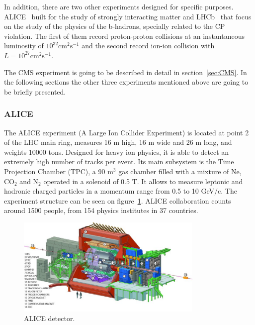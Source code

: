 In addition, there are two other experiments designed for specific purposes. ALICE~\cite{Cortese:879894} built for the study of strongly interacting matter and LHCb~\cite{Alves:2008zz} that focus on the study of the physics of the b-hadrons, specially related to the CP violation. The first of them record proton-proton collisions at an instantaneous luminosity of $10^{32}\text{cm}^{2}\text{s}^{-1}$ and the second record ion-ion collision with $L = 10^{27}\text{cm}^{2}\text{s}^{-1}$.

The CMS experiment is going to be described in detail in section~\ref{sec:CMS}. In the following sections the other three experiments mentioned above are going to be briefly presented. 

\subsubsection{ALICE}
\label{sec:alice}

The ALICE experiment (A Large Ion Collider Experiment) is located at point 2 of the LHC main ring, measures 16 m high, 16 m wide and 26 m long, and weights 10000 tons. Designed for heavy ion physics, it is able to detect an extremely high number of tracks per event. Its main subsystem is the Time Projection Chamber (TPC), a 90 $\text{m}^{3}$ gas chamber filled with a mixture of Ne, $\text{CO}_{2}$ and $\text{N}_{2}$ operated in a solenoid of 0.5 T. It allows to measure leptonic and hadronic charged particles in a momentum range from 0.5 to 10 GeV/c. The experiment structure can be seen on figure~\ref{fig:alicedet}. ALICE collaboration counts around 1500 people, from 154 physics institutes in 37 countries.

\begin{figure}[!Hhtbp]
  \begin{center}
    \includegraphics[width=0.8\textwidth]{figs/alice2.jpg}
    \caption{ALICE detector.}
    \label{fig:alicedet}
  \end{center}
\end{figure}

